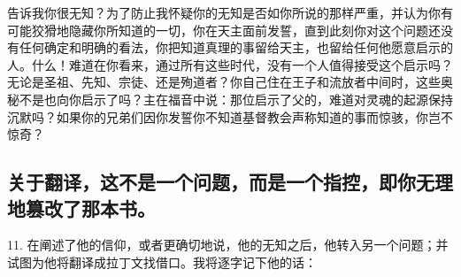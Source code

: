 告诉我你很无知？为了防止我怀疑你的无知是否如你所说的那样严重，并认为你有可能狡猾地隐藏你所知道的一切，你在天主面前发誓，直到此刻你对这个问题还没有任何确定和明确的看法，你把知道真理的事留给天主，也留给任何他愿意启示的人。什么！难道在你看来，通过所有这些时代，没有一个人值得接受这个启示吗？无论是圣祖、先知、宗徒、还是殉道者？你自己住在王子和流放者中间时，这些奥秘不是也向你启示了吗？主在福音中说：那位启示了父的，难道对灵魂的起源保持沉默吗？如果你的兄弟们因你发誓你不知道基督教会声称知道的事而惊骇，你岂不惊奇？\par


\subsection{关于翻译，这不是一个问题，而是一个指控，即你无理地篡改了那本书。}

11. 在阐述了他的信仰，或者更确切地说，他的无知之后，他转入另一个问题；并试图为他将翻译成拉丁文找借口。我将逐字记下他的话：\par

\par

